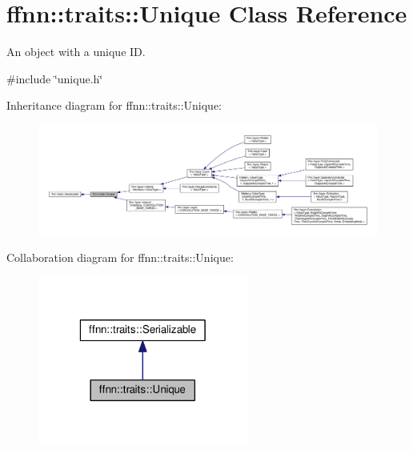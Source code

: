 \hypertarget{classffnn_1_1traits_1_1_unique}{\section{ffnn\-:\-:traits\-:\-:Unique Class Reference}
\label{classffnn_1_1traits_1_1_unique}
}


An object with a unique I\-D.  




{\ttfamily \#include \char`\"{}unique.\-h\char`\"{}}



Inheritance diagram for ffnn\-:\-:traits\-:\-:Unique\-:\nopagebreak
\begin{figure}[H]
\begin{center}
\leavevmode
\includegraphics[width=350pt]{classffnn_1_1traits_1_1_unique__inherit__graph}
\end{center}
\end{figure}


Collaboration diagram for ffnn\-:\-:traits\-:\-:Unique\-:\nopagebreak
\begin{figure}[H]
\begin{center}
\leavevmode
\includegraphics[width=196pt]{classffnn_1_1traits_1_1_unique__coll__graph}
\end{center}
\end{figure}

